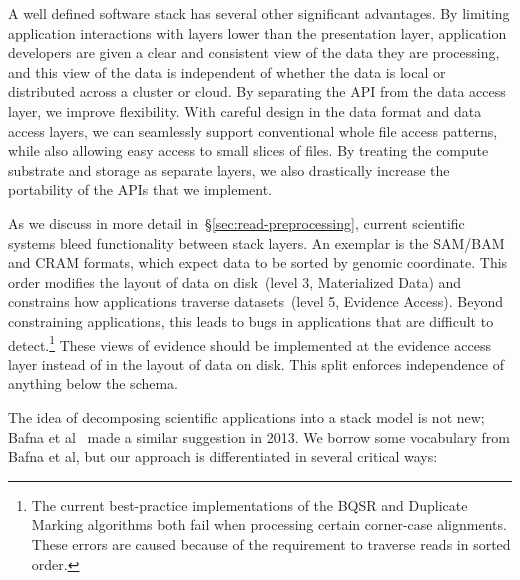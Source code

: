 \documentclass[phd]{ucbthesis}
\begin{document}
A well defined software stack has several other significant advantages. By limiting application
interactions with layers lower than the presentation layer, application developers are given a clear and
consistent view of the data they are processing, and this view of the data is independent of whether the
data is local or distributed across a cluster or cloud. By separating the API from the data access layer,
we improve flexibility. With careful design in the data format and data access layers, we can seamlessly
support conventional whole file access patterns, while also allowing easy access to small slices of files.
By treating the compute substrate and storage as separate layers, we also drastically increase
the portability of the APIs that we implement.

As we discuss in more detail in~\S\ref{sec:read-preprocessing}, current scientific systems bleed
functionality between stack layers. An exemplar is the SAM/BAM and CRAM formats, which expect data
to be sorted by genomic coordinate. This order modifies the layout of data on disk~(level 3, Materialized Data)
and constrains how applications traverse datasets~(level 5, Evidence Access). Beyond
constraining applications, this leads to bugs in applications that are difficult to detect.\footnote{The
current best-practice implementations of the BQSR and Duplicate Marking algorithms both fail when
processing certain corner-case alignments. These errors are caused because of the requirement to
traverse reads in sorted order.} These views of evidence should be implemented at the evidence
access layer instead of in the layout of data on disk. This split enforces independence of anything below the
schema.

The idea of decomposing scientific applications into a stack model is not new; Bafna et al~\cite{bafna13}
made a similar suggestion in 2013. We borrow some vocabulary from Bafna et al, but our approach is
differentiated in several critical ways:
\end{document}
